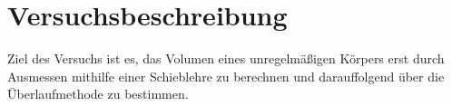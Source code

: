 \section{Versuchsbeschreibung}
\label{sec:Theorie}

Ziel des Versuchs ist es, das Volumen eines unregelmäßigen Körpers erst durch Ausmessen mithilfe einer Schieblehre zu berechnen und darauffolgend über die Überlaufmethode zu bestimmen.
